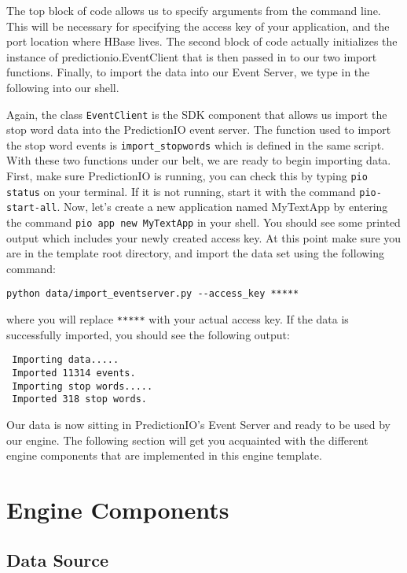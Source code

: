 \documentclass[a4paper,12pt]{article}
\renewcommand{\tt}[1]{\texttt{#1}}
\newcommand{\3}{\left}
\newcommand{\4}{\right}
\renewcommand{\-}[1]{{}^{-#1}}
\begin{document}
The top block of code allows us to specify arguments from the command line. This will be necessary for specifying the access key of your application, and the port location where HBase lives. The second block of code actually initializes the instance of predictionio.EventClient that is then passed in to our two import functions. Finally, to import the data into our Event Server, we type in the following into our shell.

Again, the class \tt{EventClient} is the SDK component that allows us import the stop word data into the PredictionIO event server. The function used to import the stop word events is \tt{import\_stopwords} which is defined in the same script. With these two functions under our belt, we are ready to begin importing data. First, make sure PredictionIO is running, you can check this by typing \tt{pio status} on your terminal. If it is not running, start it with the command \tt{pio-start-all}. Now, let's create a new application named MyTextApp by entering the command \tt{pio app new MyTextApp} in your shell. You should see some printed output which includes your newly created access key. At this point make sure you are in the template root directory, and import the data set using the following command:

\begin{verbatim}
python data/import_eventserver.py --access_key *****
\end{verbatim}

where you will replace \tt{*****} with your actual access key. If the data is successfully imported, you should see the following output:
 
 \begin{verbatim}
 Importing data.....
 Imported 11314 events.
 Importing stop words.....
 Imported 318 stop words.
 \end{verbatim}
 
Our data is now sitting in PredictionIO's Event Server and ready to be used by our engine. The following section will get you acquainted with the different engine components that are implemented in this engine template.

\break

\section*{Engine Components}

\subsection*{Data Source}
\end{document}
